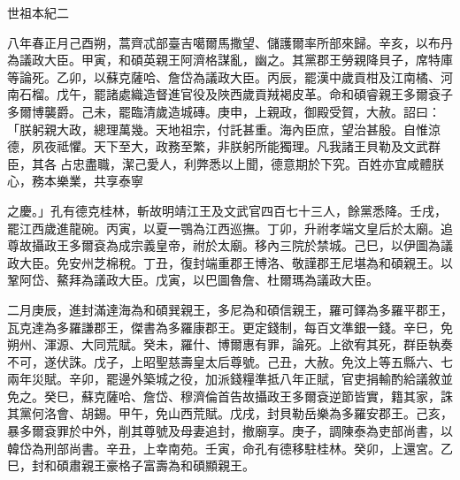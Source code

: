
\begin{pinyinscope}
世祖本紀二

八年春正月己酉朔，蒿齊忒部臺吉噶爾馬撒望、儲護爾率所部來歸。辛亥，以布丹為議政大臣。甲寅，和碩英親王阿濟格謀亂，幽之。其黨郡王勞親降貝子，席特庫等論死。乙卯，以蘇克薩哈、詹岱為議政大臣。丙辰，罷漢中歲貢柑及江南橘、河南石榴。戊午，罷諸處織造督進官役及陜西歲貢羢褐皮革。命和碩睿親王多爾袞子多爾博襲爵。己未，罷臨清歲造城磚。庚申，上親政，御殿受賀，大赦。詔曰：「朕躬親大政，總理萬幾。天地祖宗，付託甚重。海內臣庶，望治甚殷。自惟涼德，夙夜祗懼。天下至大，政務至繁，非朕躬所能獨理。凡我諸王貝勒及文武群臣，其各占忠盡職，潔己愛人，利弊悉以上聞，德意期於下究。百姓亦宜咸體朕心，務本樂業，共享泰寧

之慶。」孔有德克桂林，斬故明靖江王及文武官四百七十三人，餘黨悉降。壬戌，罷江西歲進龍碗。丙寅，以夏一鶚為江西巡撫。丁卯，升祔孝端文皇后於太廟。追尊故攝政王多爾袞為成宗義皇帝，祔於太廟。移內三院於禁城。己巳，以伊圖為議政大臣。免安州芝棉稅。丁丑，復封端重郡王博洛、敬謹郡王尼堪為和碩親王。以鞏阿岱、鰲拜為議政大臣。戊寅，以巴圖魯詹、杜爾瑪為議政大臣。

二月庚辰，進封滿達海為和碩巽親王，多尼為和碩信親王，羅可鐸為多羅平郡王，瓦克達為多羅謙郡王，傑書為多羅康郡王。更定錢制，每百文準銀一錢。辛巳，免朔州、渾源、大同荒賦。癸未，羅什、博爾惠有罪，論死。上欲宥其死，群臣執奏不可，遂伏誅。戊子，上昭聖慈壽皇太后尊號。己丑，大赦。免汶上等五縣六、七兩年災賦。辛卯，罷邊外築城之役，加派錢糧準抵八年正賦，官吏捐輸酌給議敘並免之。癸巳，蘇克薩哈、詹岱、穆濟倫首告故攝政王多爾袞逆節皆實，籍其家，誅其黨何洛會、胡錫。甲午，免山西荒賦。戊戌，封貝勒岳樂為多羅安郡王。己亥，暴多爾袞罪於中外，削其尊號及母妻追封，撤廟享。庚子，調陳泰為吏部尚書，以韓岱為刑部尚書。辛丑，上幸南苑。壬寅，命孔有德移駐桂林。癸卯，上還宮。乙巳，封和碩肅親王豪格子富壽為和碩顯親王。


\end{pinyinscope}

